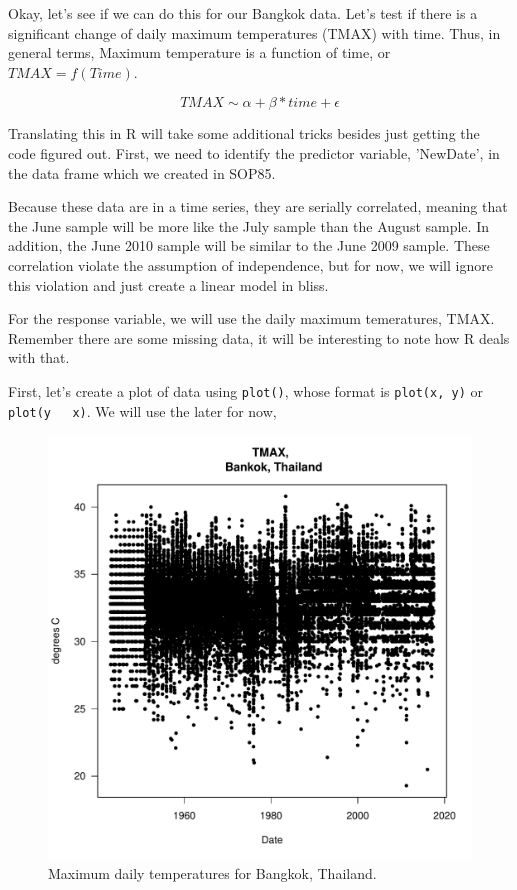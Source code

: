 \documentclass{article}\usepackage[]{graphicx}\usepackage[]{color}
\makeatletter
\def\maxwidth{ %
  \ifdim\Gin@nat@width>\linewidth
    \linewidth
  \else
    \Gin@nat@width
  \fi
}
\newenvironment{knitrout}{}{} %
\makeatother
\begin{document}
Okay, let's see if we can do this for our Bangkok data. Let's test if there is a significant change of daily maximum temperatures (TMAX) with time. Thus, in general terms, Maximum temperature is a function of time, or $TMAX = f(Time)$. 

\begin{equation}
TMAX \sim \alpha + \beta * time + \epsilon
\end{equation}

Translating this in R will take some additional tricks besides just getting the code figured out. First, we need to identify the predictor variable, 'NewDate', in the data frame which we created in SOP85. 

Because these data are in a time series, they are serially correlated, meaning that the June sample will be more like the July sample than the August sample. In addition, the June 2010 sample will be similar to the June 2009 sample. These correlation violate the assumption of independence, but for now, we will ignore this violation and just create a linear model in bliss. 

For the response variable, we will use the daily maximum temeratures, TMAX. Remember there are some missing data, it will be interesting to note how R deals with that.

First, let's create a plot of data using \texttt{plot()}, whose format is \texttt{plot(x, y)} or \texttt{plot(y ~ x)}. We will use the later for now, 

\begin{figure}
\label{fig:test12}
\caption{Maximum daily temperatures for Bangkok, Thailand.}
\begin{knitrout}
\color{fgcolor}
\includegraphics[width=\maxwidth]{figure/Tmaxplot-1} 

\end{knitrout}
\end{figure}
\end{document}
